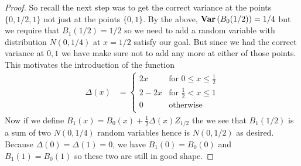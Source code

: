 \begin{proof}
So recall the next step was to get the correct variance at the points
$\lbrace 0, 1/2, 1\rbrace$ not just at the points $\lbrace 0,1\rbrace$.  By the above,
$\textbf{Var} \left (B_0(1/2) \right ) = 1/4$ but we require that $B_1(1/2) = 1/2$ so we
need to add a random variable with distribution $N(0, 1/4)$ at $x=1/2$
satisfy our goal.
But since we had the
correct variance at ${0,1}$ we have make sure not to add any more
at either of those points.  This motivates the introduction of the function
\begin{align*}
\Delta(x) &= \begin{cases}
2x & \text{for $0 \leq x \leq \frac{1}{2}$} \\
2 - 2x & \text{for $\frac{1}{2} < x \leq 1$} \\
0 & \text{otherwise} \\
\end{cases}
\end{align*}
Now if we define $B_1(x) = B_0(x) + \frac{1}{2}\Delta(x) Z_{1/2}$
the we see that $B_1(1/2)$ is a sum of two $N(0,1/4)$ random variables
hence is $N(0,1/2)$ as desired.  Because $\Delta(0) = \Delta(1) =
0$, we have $B_1(0) = B_0(0)$ and $B_1(1) = B_0(1)$ so these two are
still in good shape.  


\end{proof}
